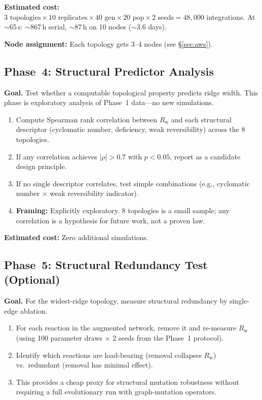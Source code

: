 \documentclass[aps,prl,twocolumn,superscriptaddress,floatfix]{revtex4-2}
\newcommand{\Rw}{R_{\mathrm{w}}}
\begin{document}
\textbf{Estimated cost:}
$3 \text{ topologies} \times 10 \text{ replicates} \times
40 \text{ gen} \times 20 \text{ pop} \times 2 \text{ seeds}
= 48{,}000$ integrations.
At $\sim$65\,s: $\sim$867\,h serial, $\sim$87\,h on 10 nodes
($\sim$3.6 days).

\textbf{Node assignment:}  Each topology gets 3--4 nodes
(see \S\ref{sec:aws}).

\subsection{Phase~4: Structural Predictor Analysis}
\label{sec:phase4}

\textbf{Goal.}  Test whether a computable topological property
predicts ridge width.  This phase is exploratory analysis of
Phase~1 data---no new simulations.

\begin{enumerate}[label=4.\arabic*]
  \item Compute Spearman rank correlation between $\Rw$ and
    each structural descriptor (cyclomatic number, deficiency,
    weak reversibility) across the 8 topologies.

  \item If any correlation achieves $|\rho| > 0.7$ with
    $p < 0.05$, report as a candidate design principle.

  \item If no single descriptor correlates, test simple
    combinations (e.g., cyclomatic number $\times$ weak
    reversibility indicator).

  \item \textbf{Framing:}  Explicitly exploratory.  8 topologies
    is a small sample; any correlation is a hypothesis for
    future work, not a proven law.
\end{enumerate}

\textbf{Estimated cost:} Zero additional simulations.

\subsection{Phase~5: Structural Redundancy Test (Optional)}
\label{sec:phase5}

\textbf{Goal.}  For the widest-ridge topology, measure structural
redundancy by single-edge ablation.

\begin{enumerate}[label=5.\arabic*]
  \item For each reaction in the augmented network, remove it
    and re-measure $\Rw$ (using 100 parameter draws $\times$
    2 seeds from the Phase~1 protocol).

  \item Identify which reactions are load-bearing (removal
    collapses $\Rw$) vs.\ redundant (removal has minimal effect).

  \item This provides a cheap proxy for structural mutation
    robustness without requiring a full evolutionary run with
    graph-mutation operators.
\end{enumerate}
\end{document}
